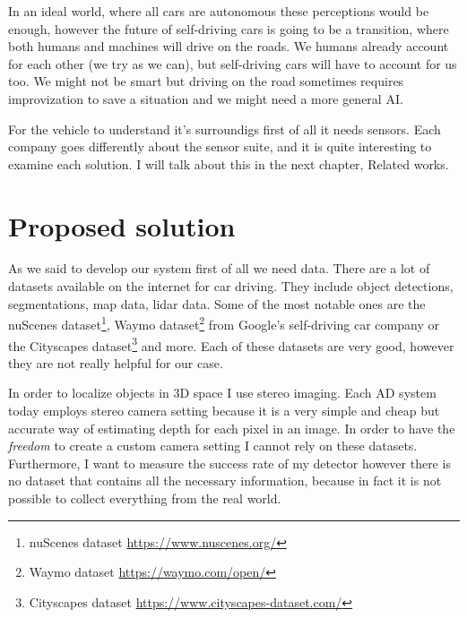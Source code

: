 In an ideal world, where all cars are autonomous these perceptions would be
enough, however the future of self-driving cars is going to be a transition,
where both humans and machines will drive on the roads. We humans already
account for each other (we try as we can), but self-driving cars will have to
account for us too. We might not be smart but driving on the road sometimes
requires improvization to save a situation and we might need a more general AI.

For the vehicle to understand it's surroundigs first of all it needs sensors.
Each company goes differently about the sensor suite, and it is quite
interesting to examine each solution. I will talk about this in the next
chapter, Related works.

\section{Proposed solution}

As we said to develop our system first of all we need data. There are a lot of
datasets available on the internet for car driving. They include object
detections, segmentations, map data, lidar data. Some of the most notable ones
are the nuScenes dataset\footnote{nuScenes dataset
\url{https://www.nuscenes.org/}}, Waymo dataset\footnote{Waymo dataset
\url{https://waymo.com/open/}} from Google's self-driving car company or the
Cityscapes dataset\footnote{Cityscapes dataset
\url{https://www.cityscapes-dataset.com/}} and more. Each of these datasets are
very good, however they are not really helpful for our case.

In order to localize objects in 3D space I use stereo imaging. Each AD system
today employs stereo camera setting because it is a very simple and cheap but
accurate way of estimating depth for each pixel in an image. In order to have
the \emph{freedom} to create a custom camera setting I cannot rely on these
datasets. Furthermore, I want to measure the success rate of my detector however
there is no dataset that contains all the necessary information, because in fact
it is not possible to collect everything from the real world.

